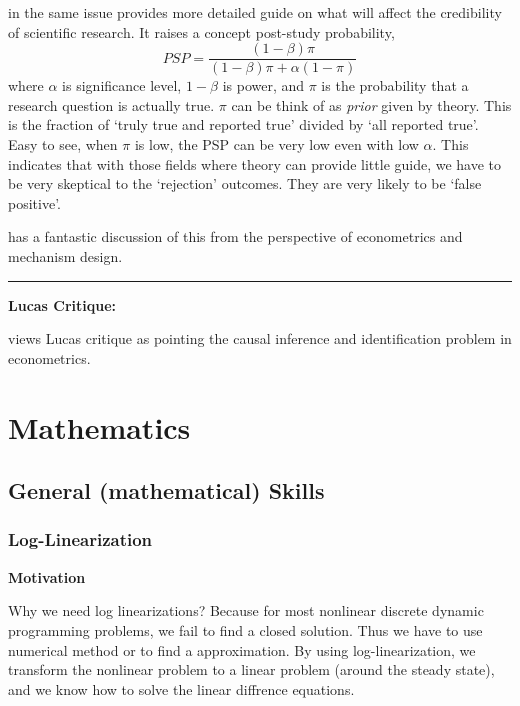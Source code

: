 \documentclass{book}
\theoremstyle{plain}
\theoremstyle{definition}
\newcommand{\myline}{\vspace{3mm} \hrule \vspace{4mm}}
\begin{document}
\cite{Maniadis:2017hi} in the same issue provides more detailed guide on what will affect the credibility of scientific research.
It raises a concept post-study probability,
\[PSP=\frac{(1-\beta)\pi}{(1-\beta)\pi+ \alpha(1-\pi)}\]
where $\alpha$ is significance level, $1-\beta$ is power,
and $\pi$ is the probability that a research question is actually true. $\pi$ can be think of as \textit{prior} given by theory.
This is the fraction of `truly true and reported true' divided by `all reported true'.
Easy to see, when $\pi$ is low, 
the PSP can be very low even with low $\alpha$.
This indicates that with those fields where theory can provide little guide,
we have to be very skeptical to the `rejection' outcomes.
They are very likely to be `false positive'. 

\cite{Spiess:2017tp} has a fantastic discussion of this from the perspective of econometrics and mechanism design.


\myline

\noindent
\textbf{Lucas Critique:}

\cite{Hoover:94JEMethod} views Lucas critique as pointing the causal inference and identification problem in econometrics.










\part{Mathematics}

\chapter{General (mathematical) Skills} %
\label{cha:general_mathematical_skills}

\section{Log-Linearization}

\noindent
\textbf{Motivation}

Why we need log linearizations?
Because for most nonlinear discrete dynamic programming problems,
we fail to find a closed solution.
Thus we have to use numerical method or to find a approximation.
By using log-linearization,
we transform the nonlinear problem to a linear problem (around the steady state),
and we know how to solve the linear diffrence equations.
\end{document}
